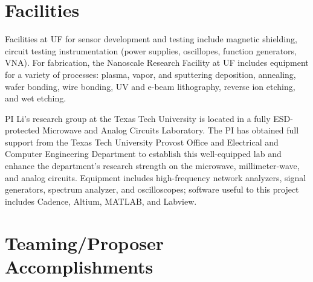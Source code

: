 \section{Facilities}

Facilities at UF for sensor development and testing include magnetic shielding, circuit testing instrumentation (power supplies, oscillopes, function generators, VNA). For fabrication, the Nanoscale Research Facility at UF includes equipment for a variety of processes: plasma, vapor, and sputtering deposition, annealing, wafer bonding, wire bonding, UV and e-beam lithography, reverse ion etching, and wet etching.

PI Li’s research group at the Texas Tech University is located in a fully ESD-protected Microwave and Analog Circuits Laboratory. The PI has obtained full support from the Texas Tech University Provost Office and Electrical and Computer Engineering Department to establish this well-equipped lab and enhance the department’s research strength on the microwave, millimeter-wave, and analog circuits. Equipment includes high-frequency network analyzers, signal generators, spectrum analyzer, and oscilloscopes; software useful to this project includes Cadence, Altium, MATLAB, and Labview.

\section{Teaming/Proposer Accomplishments}

